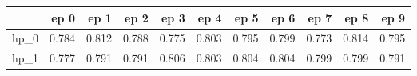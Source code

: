 \begin{tabular}{lrrrrrrrrrr}
\toprule
{} &   ep 0 &   ep 1 &   ep 2 &   ep 3 &   ep 4 &   ep 5 &   ep 6 &   ep 7 &   ep 8 &   ep 9 \\
\midrule
hp\_0 &  0.784 &  0.812 &  0.788 &  0.775 &  0.803 &  0.795 &  0.799 &  0.773 &  0.814 &  0.795 \\
hp\_1 &  0.777 &  0.791 &  0.791 &  0.806 &  0.803 &  0.804 &  0.804 &  0.799 &  0.799 &  0.791 \\
\bottomrule
\end{tabular}

